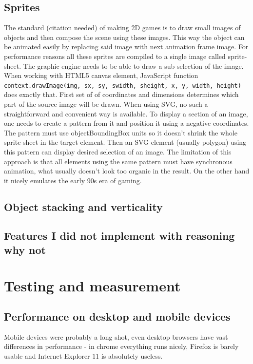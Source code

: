\documentclass[11pt,oneside, final]{fithesis2}
\begin{document}
\section{Sprites}
The standard (citation needed) of making 2D games is to draw small images of objects and then compose the scene using these images. This way the object can be animated easily by replacing said image with next animation frame image. For performance reasons all these sprites are compiled to a single image called sprite-sheet. The graphic engine needs to be able to draw a sub-selection of the image. When working with HTML5 canvas element, JavaScript function \texttt{context.drawImage(img, sx, sy, swidth, sheight, x, y, width, height)} does exactly that. First set of of coordinates and dimensions determines which part of the source image will be drawn. When using SVG, no such a straightforward and convenient way is available. To display a section of an image, one needs to create a pattern from it and position it using a negative coordinates. The pattern must use objectBoundingBox units so it doesn't shrink the whole sprite-sheet in the target element. Then an SVG element (usually polygon) using this pattern can display desired selection of an image.
The limitation of this approach is that all elements using the same pattern must have synchronous animation, what usually doesn't look too organic in the result. On the other hand it nicely emulates the early 90s era of gaming.

\section{Object stacking and verticality}

\section{Features I did not implement with reasoning why not}

\chapter{Testing and measurement}
\label{testing}

\section{Performance on desktop and mobile devices}
Mobile devices were probably a long shot, even desktop browsers have vast differences in performance - in chrome everything runs nicely, Firefox is barely usable and Internet Explorer 11 is absolutely useless.
\end{document}
